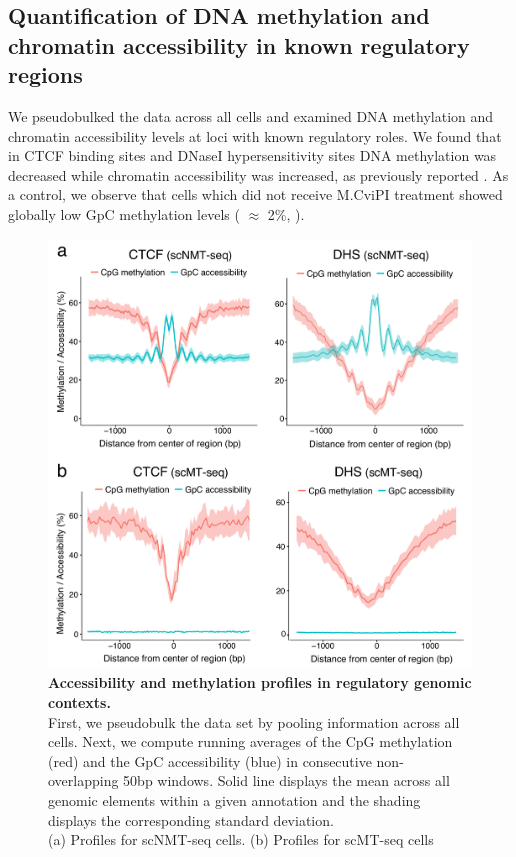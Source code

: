 \subsection{Quantification of DNA methylation and chromatin accessibility in known regulatory regions}

We pseudobulked the data across all cells and examined DNA methylation and chromatin accessibility levels at loci with known regulatory roles. We found that in CTCF binding sites and DNaseI hypersensitivity sites DNA methylation was decreased while chromatin accessibility was increased, as previously reported \cite{Pott2016}. As a control, we observe that cells which did not receive M.CviPI treatment showed globally low GpC methylation levels ( $\approx$ 2\%, ).

\begin{figure}[H]
	\centering
	\includegraphics[width=0.7\linewidth]{scnmt_pseudobulk_profiles}
	\caption[]{\textbf{Accessibility and methylation profiles in regulatory genomic contexts.}\\
	First, we pseudobulk the data set by pooling information across all cells. Next, we compute running averages of the CpG methylation (red) and the GpC accessibility (blue) in consecutive non-overlapping 50bp windows. Solid line displays the mean across all genomic elements within a given annotation and the shading displays the corresponding standard deviation.\\
	(a) Profiles for scNMT-seq cells. (b) Profiles for scMT-seq cells
	}
	\label{fig:scnmt_pseudobulk_profiles}
\end{figure}

